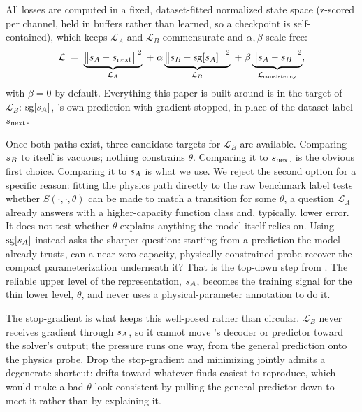 All losses are computed in a fixed, dataset-fitted normalized state
space (z-scored per channel, held in buffers rather than learned, so a
checkpoint is self-contained), which keeps $\mathcal L_A$ and
$\mathcal L_B$ commensurate and $\alpha,\beta$ scale-free:
\begin{equation}
  \label{eq:loss}
  \mathcal L \;=\; \underbrace{\big\lVert s_A - s_{\mathrm{next}}
    \big\rVert^2}_{\mathcal L_A}
  \;+\; \alpha \underbrace{\big\lVert s_B - \mathrm{sg}\!\left[s_A\right]
    \big\rVert^2}_{\mathcal L_B}
  \;+\; \beta \underbrace{\big\lVert s_A - s_B \big\rVert^2}
    _{\mathcal L_{\mathrm{consistency}}},
\end{equation}
with $\beta = 0$ by default. Everything this paper is built around is
in the target of $\mathcal L_B$: $\mathrm{sg}\!\left[s_A\right]$, \pathA's own
prediction with gradient stopped, in place of the dataset label
$s_{\mathrm{next}}$.

Once both paths exist, three candidate targets for $\mathcal L_B$ are
available. Comparing $s_B$ to itself is vacuous; nothing
constrains $\theta$. Comparing it to $s_{\mathrm{next}}$ is the obvious first
choice. Comparing it to $s_A$ is what we use. We reject the second
option for a specific reason: fitting the physics path directly to the
raw benchmark label tests whether $S(\cdot,\cdot,\theta)$ can be made
to match a transition for some $\theta$, a question $\mathcal L_A$
already answers with a higher-capacity function class and, typically,
lower error. It does not test whether $\theta$ explains anything the
model itself relies on. Using $\mathrm{sg}\!\left[s_A\right]$ instead asks the
sharper question: starting from a prediction the model already trusts,
can a near-zero-capacity, physically-constrained probe recover the
compact parameterization underneath it? That is the top-down step from
. The reliable upper level of the
representation, $s_A$, becomes the training signal for the thin
lower level, $\theta$, and  never uses a
physical-parameter annotation to do it.

The stop-gradient is what keeps this well-posed rather than circular.
$\mathcal L_B$ never receives gradient through $s_A$, so it cannot
move \pathA's decoder or predictor toward the solver's output; the
pressure runs one way, from the general prediction onto the physics
probe. Drop the stop-gradient and minimizing  jointly
admits a degenerate shortcut: \pathA drifts toward whatever \pathB
finds easiest to reproduce, which would make a bad $\theta$ look
consistent by pulling the general predictor down to meet it rather
than by explaining it.

